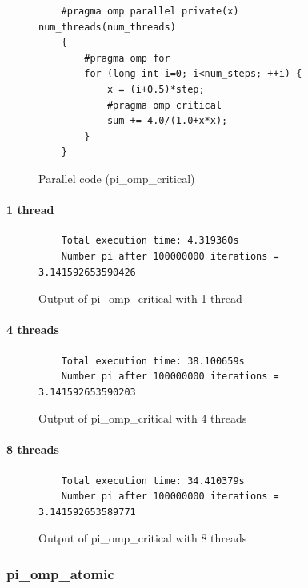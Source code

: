 \documentclass[12pt, a4paper]{article}
\begin{document}
\begin{figure}[H]
	\begin{lstlisting}
	#pragma omp parallel private(x) num_threads(num_threads)
    {
        #pragma omp for 
        for (long int i=0; i<num_steps; ++i) {
            x = (i+0.5)*step;
            #pragma omp critical 
	    	sum += 4.0/(1.0+x*x);
        }
    }
	\end{lstlisting}
	
	\caption{Parallel code (pi\_omp\_critical)}
\end{figure}

\paragraph{1 thread}

\begin{figure}[H]
	\begin{lstlisting}
	Total execution time: 4.319360s
	Number pi after 100000000 iterations = 3.141592653590426		
	\end{lstlisting}
	\caption{Output of pi\_omp\_critical with 1 thread}
\end{figure}

\paragraph{4 threads}

\begin{figure}[H]
	\begin{lstlisting}
	Total execution time: 38.100659s
	Number pi after 100000000 iterations = 3.141592653590203		
	\end{lstlisting}
	\caption{Output of pi\_omp\_critical with 4 threads}
\end{figure}

\paragraph{8 threads}

\begin{figure}[H]
	\begin{lstlisting}
	Total execution time: 34.410379s
	Number pi after 100000000 iterations = 3.141592653589771		
	\end{lstlisting}
	\caption{Output of pi\_omp\_critical with 8 threads}
\end{figure}

\subsubsection{pi\_omp\_atomic}
\end{document}
